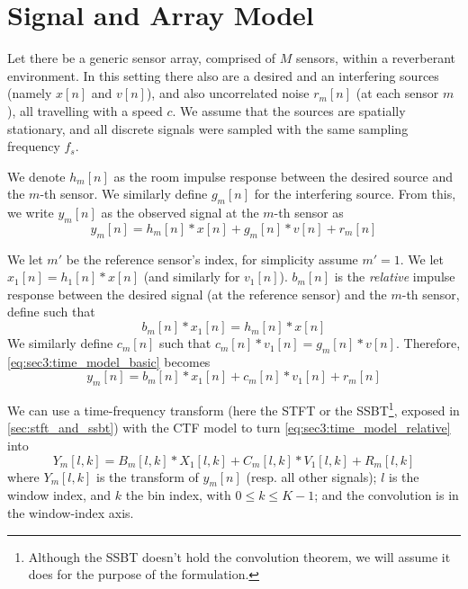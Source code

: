 \section{Signal and Array Model}
\label{sec:signal_model}

Let there be a generic sensor array, comprised of $M$ sensors, within a reverberant environment. In this setting there also are a desired and an interfering sources (namely $x[n]$ and $v[n]$), and also uncorrelated noise $r_m[n]$ (at each sensor $m$), all travelling with a speed $c$. We assume that the sources are spatially stationary, and all discrete signals were sampled with the same sampling frequency $f_s$.

We denote $h_m[n]$ as the room impulse response between the desired source and the $m$-th sensor. We similarly define $g_m[n]$ for the interfering source. From this, we write $y_m[n]$ as the observed signal at the $m$-th sensor as
\begin{equation}
	\label{eq:sec3:time_model_basic}
	y_m[n] = h_m[n] \ast x[n] + g_m[n] \ast v[n] + r_m[n]
\end{equation}

We let $m'$ be the reference sensor's index, for simplicity assume $m'=1$. We let $x_1[n] = h_1[n] \ast x[n]$ (and similarly for $v_1[n]$). $b_m[n]$ is the \textit{relative} impulse response between the desired signal (at the reference sensor) and the $m$-th sensor, define such that
\begin{equation}
	b_m[n] \ast x_1[n] = h_m[n] \ast x[n]
\end{equation}
We similarly define $c_m[n]$ such that $c_m[n] \ast v_1[n] = g_m[n] \ast v[n]$. Therefore, \cref{eq:sec3:time_model_basic} becomes
\begin{equation}
	\label{eq:sec3:time_model_relative}
	y_m[n] = b_m[n] \ast x_1[n] + c_m[n] \ast v_1[n] + r_m[n]
\end{equation}
%

We can use a time-frequency transform (here the STFT or the SSBT\footnote{Although the SSBT doesn't hold the convolution theorem, we will assume it does for the purpose of the formulation.}, exposed in \cref{sec:stft_and_ssbt}) with the CTF model \cite{talmon_relative_2009} to turn \cref{eq:sec3:time_model_relative} into
\begin{equation}
	\label{eq:sec3:time-freq_model_conv}
	Y_m[l,k] = B_m[l,k] \ast X_1[l,k] + C_m[l,k] \ast V_1[l,k] + R_m[l,k]
\end{equation}
where $Y_m[l,k]$ is the transform of $y_m[n]$ (resp. all other signals); $l$ is the window index, and $k$ the bin index, with $0 \leq k \leq K-1$; and the convolution is in the window-index axis.


